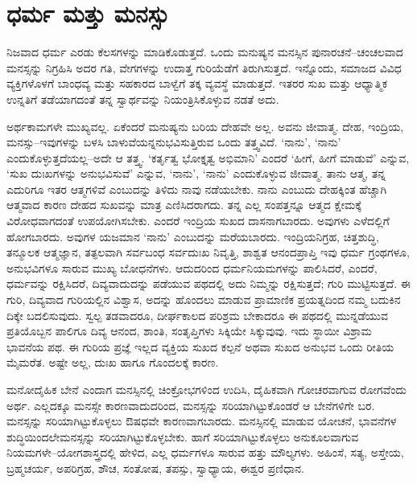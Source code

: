 \section*{ಧರ್ಮ ಮತ್ತು ಮನಸ್ಸು}


ನಿಜವಾದ ಧರ್ಮ ಎರಡು ಕೆಲಸಗಳನ್ನು ಮಾಡಿಕೊಡುತ್ತದೆ. ಒಂದು ಮನುಷ್ಯನ ಮನಸ್ಸಿನ ಪುನಾರಚನೆ–ಚಂಚಲವಾದ ಮನಸ್ಸನ್ನು ನಿಗ್ರಹಿಸಿ ಅದರ ಗತಿ, ವೇಗಗಳನ್ನು ಉದಾತ್ತ ಗುರಿಯೆಡೆಗೆ ತಿರುಗಿಸುತ್ತದೆ. ಇನ್ನೊಂದು, ಸಮಾಜದ ವಿವಿಧ ವ್ಯಕ್ತಿಗಳೊಳಗೆ ಬಾಂಧವ್ಯ ಮತ್ತು ಸಹಕಾರದ ಬಾಳ್ವೆಗೆ ತಕ್ಕ ವ್ಯವಸ್ಥೆ ಮಾಡುತ್ತದೆ. ಇತರರ ಸುಖ ಮತ್ತು ಆಧ್ಯಾತ್ಮಿಕ ಉನ್ನತಿಗೆ ತಡೆಯಾಗದಂತೆ ತನ್ನ ಸ್ವಾರ್ಥವನ್ನು ನಿಯಂತ್ರಿಸಿಕೊಳ್ಳುವ ನಡತೆ ಅದು.

ಅರ್ಥಕಾಮಗಳೇ ಮುಖ್ಯವಲ್ಲ. ಏಕೆಂದರೆ ಮನುಷ್ಯನು ಬರಿಯ ದೇಹವೇ ಅಲ್ಲ. ಅವನು ಜೀವಾತ್ಮ. ದೇಹ, ಇಂದ್ರಿಯ, ಮನಸ್ಸು–ಇವುಗಳನ್ನು ಬಳಸಿ ಬಾಳುವೆಯನ್ನನುಭವಿಸುತ್ತಿರುವ ಒಂದು ತತ್ತ್ವವಿದೆ. ‘ನಾನು’, ‘ನಾನು’ ಎಂದುಕೊಳ್ಳುತ್ತದೆಯಲ್ಲ–ಅದೇ ಆ ತತ್ತ್ವ. ‘ಕರ್ತೃತ್ವ ಭೋಕ್ತೃತ್ವ ಅಭಿಮಾನಿ’ ಎಂದರೆ ‘ಹೀಗೆ, ಹೀಗೆ ಮಾಡುವೆ’ ಎನ್ನುವ, ‘ಸುಖ ದುಃಖಗಳನ್ನು ಅನುಭವಿಸುವೆ’ ಎನ್ನುವ, ‘ನಾನು’, ‘ನಾನು’ ಎಂದುಕೊಳ್ಳುವ ಜೀವಾತ್ಮ. ತಾನು ಆತ್ಮ, ತನ್ನ ಎದುರಿಗೂ ಇತರ ಆತ್ಮಗಳಿವೆ ಎಂಬುದನ್ನು ತಿಳಿದು ನಾವು ನಡೆಯಬೇಕು. ನಾನು ಎಂಬುದು ದೇಹಕ್ಕಿಂತ ಹೆಚ್ಚಾಗಿ ಆತ್ಮವಾದ ಕಾರಣ ದೇಹದ ಸುಖವನ್ನು ಮಾತ್ರ ಎಣಿಸಿದರಾಗದು. ತನ್ನ ಎಲ್ಲ ಸಂಪತ್ತನ್ನೂ ಆತ್ಮದ ಕ್ಷೇಮಕ್ಕೆ ವಿರೋಧವಾಗದಂತೆ ಉಪಯೋಗಿಸಬೇಕು. ಎಂದರೆ ಇಂದ್ರಿಯ ಸುಖದ ದಾಸನಾಗಬಾರದು. ಅವುಗಳು ಎಳೆದಲ್ಲಿಗೆ ಹೋಗಬಾರದು. ಅವುಗಳ ಯಜಮಾನ ‘ನಾನು’ ಎಂಬುದನ್ನು ಮರೆಯಬಾರದು. ಇಂದ್ರಿಯನಿಗ್ರಹ, ಚಿತ್ತಶುದ್ಧಿ, ತನ್ಮೂಲಕ ಆತ್ಮಜ್ಞಾನ, ತತ್ಫಲವಾಗಿ ಸರ್ವಬಂಧ ಸರ್ವದುಃಖ ನಿವೃತ್ತಿ, ಶಾಶ್ವತ ಆನಂದಪ್ರಾಪ್ತಿ ಇವು ಧರ್ಮ ಗ್ರಂಥಗಳೂ, ಅನುಭವಿಗಳೂ ಸಾರುವ ಮುಖ್ಯ ಬೋಧನೆಗಳು. ಆದುದರಿಂದ ಧರ್ಮನಿಯಮಗಳನ್ನು ಪಾಲಿಸಿದರೆ, ಎಂದರೆ, ಧರ್ಮವನ್ನು ರಕ್ಷಿಸಿದರೆ, ದಿವ್ಯವಾದುದನ್ನು ಪಡೆಯುವ ಪಥದಲ್ಲಿ ಅದು ನಿಮ್ಮನ್ನು ರಕ್ಷಿಸುತ್ತದೆ; ಗುರಿ ಮುಟ್ಟಿಸುತ್ತದೆ. ಈ ಗುರಿ, ದಿವ್ಯವಾದ ಗುರಿಯಲ್ಲಿನ ವಿಶ್ವಾಸ, ಅದನ್ನು ಹೊಂದಲು ಮಾಡುವ ಪ್ರಾಮಾಣಿಕ ಪ್ರಯತ್ನದಿಂದ ನಮ್ಮ ಬದುಕಿನ ದಿಕ್ಕೇ ಬದಲಿಸುವುದು. ಸ್ವಲ್ಪ ತಡವಾದರೂ, ದೀರ್ಘಕಾಲದ ಪರಿಶ್ರಮ ಬೇಕಾದರೂ ಈ ಪಥದಲ್ಲಿ ಮುನ್ನಡೆಯುವ ಪ್ರತಿಯೊಬ್ಬನ ಪಾಲಿಗೂ ದಿವ್ಯ ಆನಂದ, ಶಾಂತಿ, ಸಂತೃಪ್ತಿಗಳು ಸಿಕ್ಕಿಯೇ ಸಿಕ್ಕುವುವು. ಇದು ಸ್ಥಾಯೀ ವಿಶ್ರಾಮ ಭಾವನೆಯ ಪಥ. ಈ ಗುರಿಯ ಪ್ರಜ್ಞೆ ಇಲ್ಲದ ವ್ಯಕ್ತಿಯ ಸುಖದ ಕಲ್ಪನೆ ಅಥವಾ ಸುಖದ ಅನುಭವ ಒಂದು ರೀತಿಯ ಮೈಮರೆತ. ಅಷ್ಟೇ ಅಲ್ಲ, ದುಃಖ ಹಾಗೂ ಗೊಂದಲಕ್ಕೆ ಕಾರಣ.

\vskip 3pt

ಮನೋದೈಹಿಕ ಬೇನೆ ಎಂದಾಗ ಮನಸ್ಸಿನಲ್ಲಿ ಚಿಂಕ್ರೋಭಗಳಿಂದ ಉದಿಸಿ, ದೈಹಿಕವಾಗಿ ಗೋಚರವಾಗುವ ರೋಗವೆಂದು ಅರ್ಥ. ಎಲ್ಲದಕ್ಕೂ ಮನಸ್ಸೇ ಕಾರಣವಾದುದರಿಂದ, ಮನಸ್ಸನ್ನು ಸರಿಯಾಗಿಟ್ಟುಕೊಂಡರೆ ಆ ಬೇನೆಗಳಿಗೇ ಬರ. ಮನಸ್ಸನ್ನು ಸರಿಯಾಗಿಟ್ಟುಕೊಳ್ಳಲು ಔಷಧವೇ ಕಾರಣವಾಗಬಾರದು. ಮನಸ್ಸಿನಲ್ಲಿ ಮಾಡುವ ಯೋಚನೆ, ಭಾವನೆಗಳ ಶುದ್ಧಿಯಿಂದಲೇ\break ಮನಸ್ಸನ್ನು ಸರಿಯಾಗಿಟ್ಟುಕೊಳ್ಳಬೇಕು. ಹಾಗೆ ಸರಿಯಾಗಿಟ್ಟುಕೊಳ್ಳಲು ಅನುಕೂಲವಾಗುವ ನಿಯಮಗಳೇ–ಯೋಗಶಾಸ್ತ್ರದಲ್ಲಿ ಹೇಳಿದ, ಎಲ್ಲ ಧರ್ಮಗಳೂ ಸಾರುವ ಹತ್ತು ಮೌಲ್ಯಗಳು. ಅಹಿಂಸೆ, ಸತ್ಯ, ಅಸ್ತೇಯ, ಬ್ರಹ್ಮಚರ್ಯ, ಅಪರಿಗ್ರಹ, ಶೌಚ, ಸಂತೋಷ, ತಪಸ್ಸು, ಸ್ವಾಧ್ಯಾಯ, ಈಶ್ವರ ಪ್ರಣಿಧಾನ.

